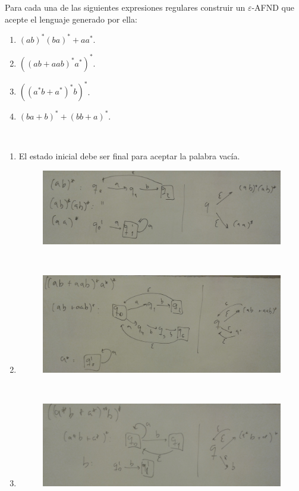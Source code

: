 \documentclass[twoside]{article}
\begin{document}
\newpage

\begin{ejercicio}{6}
Para cada una de las siguientes expresiones regulares construir un $\varepsilon$-AFND que
acepte el lenguaje generado por ella:
\begin{enumerate}
\item $(ab)^*(ba)^*+aa^*$.
\item $((ab+aab)^*a^*)^*$.
\item $((a^*b+a^*)^*b)^*$.
\item $(ba + b)^* + (bb + a)^*$.
\end{enumerate}
\end{ejercicio}
\begin{solucion}\
\begin{enumerate}
\item El estado inicial debe ser final para aceptar la palabra vacía.

\begin{figure}[h!]
\includegraphics[scale=0.1]{Automatas/6-1}
\end{figure}\

\item 

\begin{figure}[h!]
\includegraphics[scale=0.1]{Automatas/6-2}
\end{figure}\
\item

\begin{figure}[h!]
\includegraphics[scale=0.1]{Automatas/6-3}
\end{figure}\


\end{enumerate}
\end{solucion}
\end{document}
